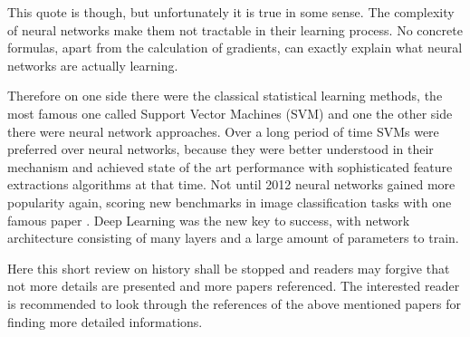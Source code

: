 This quote is though, but unfortunately it is true in some sense. 
The complexity of neural networks make them not tractable in their learning process.
No concrete formulas, apart from the calculation of gradients, can exactly explain what neural networks are actually learning.

Therefore on one side there were the classical statistical learning methods, the most famous one called Support Vector Machines (SVM) \cite{Cortes1995} and one the other side there were neural network approaches.
Over a long period of time SVMs were preferred over neural networks, because they were better understood in their mechanism and achieved state of the art performance with sophisticated feature extractions algorithms at that time.
Not until 2012 neural networks gained more popularity again, scoring new benchmarks in image classification tasks with one famous paper \cite{Krizhevsky2012}.
Deep Learning was the new key to success, with network architecture consisting of many layers and a large amount of parameters to train.

Here this short review on history shall be stopped and readers may forgive that not more details are presented and more papers referenced.
The interested reader is recommended to look through the references of the above mentioned papers for finding more detailed informations.
